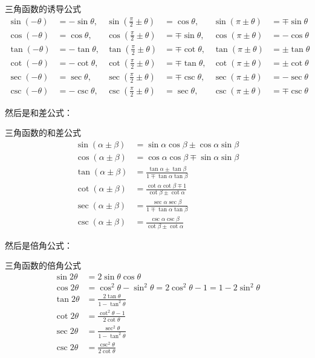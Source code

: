 \begin{theorem}{三角函数的诱导公式}{}
\[
\begin{aligned}
\sin(-\theta) &= -\sin\theta, & \sin(\frac{\pi}{2} \pm \theta) &= \cos\theta, & \sin(\pi \pm \theta) &= \mp\sin\theta \\[6pt]
\cos(-\theta) &= \cos\theta, & \cos(\frac{\pi}{2} \pm \theta) &= \mp\sin\theta, & \cos(\pi \pm \theta) &= -\cos\theta \\[6pt]
\tan(-\theta) &= -\tan\theta, & \tan(\frac{\pi}{2} \pm \theta) &= \mp\cot\theta, & \tan(\pi \pm \theta) &= \pm\tan\theta \\[6pt]
\cot(-\theta) &= -\cot\theta, & \cot(\frac{\pi}{2} \pm \theta) &= \mp\tan\theta, & \cot(\pi \pm \theta) &= \pm\cot\theta \\[6pt]
\sec(-\theta) &= \sec\theta, & \sec(\frac{\pi}{2} \pm \theta) &= \mp\csc\theta, & \sec(\pi \pm \theta) &= -\sec\theta \\[6pt]
\csc(-\theta) &= -\csc\theta, & \csc(\frac{\pi}{2} \pm \theta) &= \sec\theta, & \csc(\pi \pm \theta) &= \mp\csc\theta
\end{aligned}
\]
\end{theorem}



然后是和差公式：
\begin{theorem}{三角函数的和差公式}{}
\[
\begin{aligned}
\sin(\alpha \pm \beta) &= \sin\alpha\cos\beta \pm \cos\alpha\sin\beta \\
\cos(\alpha \pm \beta) &= \cos\alpha\cos\beta \mp \sin\alpha\sin\beta \\
\tan(\alpha \pm \beta) &= \frac{\tan\alpha \pm \tan\beta}{1 \mp \tan\alpha\tan\beta} \\
\cot(\alpha \pm \beta) &= \frac{\cot\alpha\cot\beta \mp 1}{\cot\beta \pm \cot\alpha} \\
\sec(\alpha \pm \beta) &= \frac{\sec\alpha\sec\beta}{1 \mp \tan\alpha\tan\beta} \\
\csc(\alpha \pm \beta) &= \frac{\csc\alpha\csc\beta}{\cot\beta \pm \cot\alpha}
\end{aligned}
\]
\end{theorem}

然后是倍角公式：
\begin{theorem}{三角函数的倍角公式}{}
\[
\begin{aligned}
\sin 2\theta &= 2\sin\theta\cos\theta\\
\cos 2\theta &= \cos^2\theta - \sin^2\theta = 2\cos^2\theta - 1 = 1 - 2\sin^2\theta\\
\tan 2\theta &= \frac{2\tan\theta}{1 - \tan^2\theta}\\
\cot 2\theta &= \frac{\cot^2\theta - 1}{2\cot\theta}\\
\sec 2\theta &= \frac{\sec^2\theta}{1 - \tan^2\theta}\\
\csc 2\theta &= \frac{\csc^2\theta}{2\cot\theta}
\end{aligned}
\]
\end{theorem}

